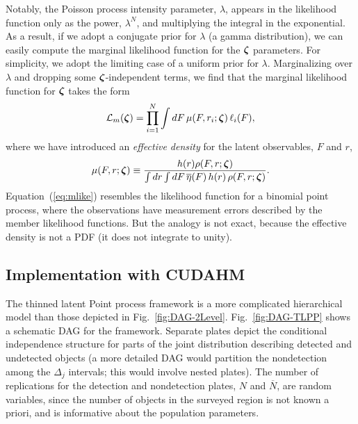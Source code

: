 Notably, the Poisson process intensity parameter, $\lambda$, appears in the likelihood function only as the power, $\lambda^N$, and multiplying the integral in the exponential.
As a result, if we adopt a conjugate prior for $\lambda$ (a gamma distribution), we can easily compute the marginal likelihood function for the $\boldsymbol{\zeta}$ parameters.
For simplicity, we adopt the limiting case of a uniform prior for $\lambda$.
Marginalizing over $\lambda$ and dropping some $\boldsymbol{\zeta}$-independent terms, we find that the marginal likelihood function for $\boldsymbol{\zeta}$ takes the form
\begin{equation}\label{eq:mlike}
\mathcal{L}_m(\boldsymbol{\zeta})
  = \prod_{i=1}^N \int dF\, \mu(F,r_i;\boldsymbol{\zeta})\, \ell_i(F),
\end{equation}
where we have introduced an \emph{effective density} for the latent observables, $F$ and $r$,
\begin{equation}\label{eq:epdf}
\mu(F,r;\boldsymbol{\zeta}) \equiv
  \frac{h(r) \rho(F,r;\boldsymbol{\zeta})}
    {\int dr \int dF\,\overline{\eta}(F)\, h(r)\, \rho(F,r;\boldsymbol{\zeta})}.
\end{equation}
Equation~(\ref{eq:mlike}) resembles the likelihood function for a binomial point process, where the observations have measurement errors described by the member likelihood functions.
But the analogy is not exact, because the effective density is not a PDF (it does not integrate to unity).


\subsection{Implementation with CUDAHM}

The thinned latent Point process framework is a more complicated hierarchical model than those depicted in Fig.~\ref{fig:DAG-2Level}.
Fig.~\ref{fig:DAG-TLPP} shows a schematic DAG for the framework.
Separate plates depict the conditional independence structure for parts of the joint distribution describing detected and undetected objects (a more detailed DAG would partition the nondetection among the $\Delta_j$ intervals; this would involve nested plates).
The number of replications for the detection and nondetection plates, $N$ and $\overline{N}$, are random variables, since the number of objects in the surveyed region is not known a priori, and is informative about the population parameters.


